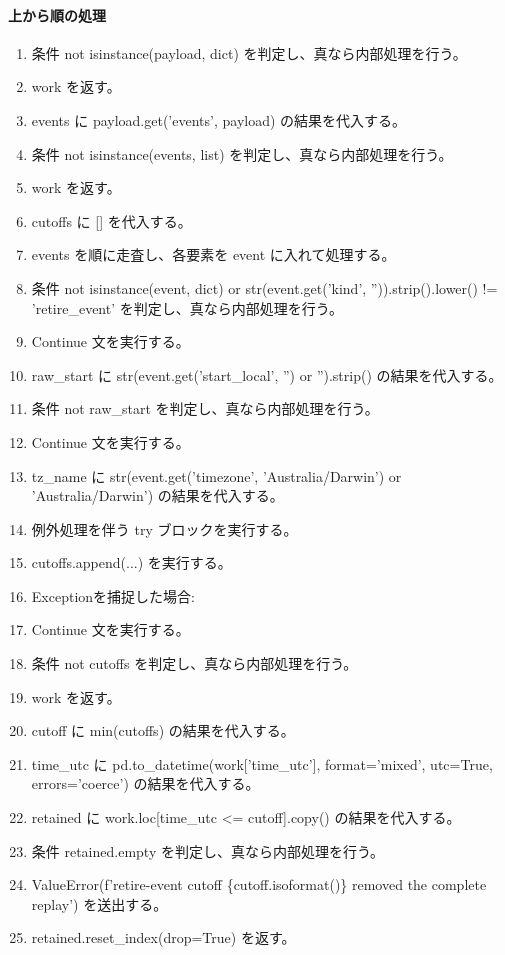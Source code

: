 \documentclass[a4paper,11pt]{article}
\begin{document}
            \paragraph{上から順の処理}
            \begin{enumerate}[leftmargin=1.8em]
            \item 条件 not isinstance(payload, dict) を判定し、真なら内部処理を行う。
\item   work を返す。
\item events に payload.get('events', payload) の結果を代入する。
\item 条件 not isinstance(events, list) を判定し、真なら内部処理を行う。
\item   work を返す。
\item cutoffs に [] を代入する。
\item events を順に走査し、各要素を event に入れて処理する。
\item   条件 not isinstance(event, dict) or str(event.get('kind', '')).strip().lower() != 'retire\_event' を判定し、真なら内部処理を行う。
\item     Continue 文を実行する。
\item   raw\_start に str(event.get('start\_local', '') or '').strip() の結果を代入する。
\item   条件 not raw\_start を判定し、真なら内部処理を行う。
\item     Continue 文を実行する。
\item   tz\_name に str(event.get('timezone', 'Australia/Darwin') or 'Australia/Darwin') の結果を代入する。
\item   例外処理を伴う try ブロックを実行する。
\item     cutoffs.append(...) を実行する。
\item     Exceptionを捕捉した場合:
\item     Continue 文を実行する。
\item 条件 not cutoffs を判定し、真なら内部処理を行う。
\item   work を返す。
\item cutoff に min(cutoffs) の結果を代入する。
\item time\_utc に pd.to\_datetime(work['time\_utc'], format='mixed', utc=True, errors='coerce') の結果を代入する。
\item retained に work.loc[time\_utc <= cutoff].copy() の結果を代入する。
\item 条件 retained.empty を判定し、真なら内部処理を行う。
\item   ValueError(f'retire-event cutoff \{cutoff.isoformat()\} removed the complete replay') を送出する。
\item retained.reset\_index(drop=True) を返す。
            \end{enumerate}
\end{document}
